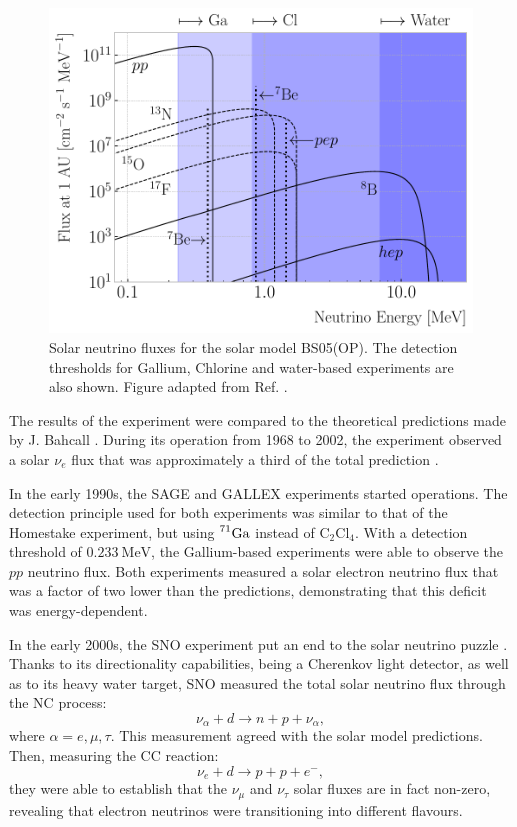 \begin{figure}[t]
	\centering
	\includegraphics[width=.75\linewidth]{Images/Nu/solar_neutrino_flux.pdf}
	\caption[Solar neutrino fluxes for the solar model BS05(OP).]{Solar neutrino fluxes for the solar model BS05(OP). The detection thresholds for Gallium, Chlorine and water-based experiments are also shown. Figure adapted from Ref. \cite{Bahcall2004}.}
	\label{fig:solar_nu_flux}
\end{figure}

The results of the experiment were compared to the theoretical predictions made by J. Bahcall \cite{Bahcall1968}. During its operation from 1968 to 2002, the experiment observed a solar $\nu_{e}$ flux that was approximately a third of the total prediction \cite{Cleveland1998}.

In the early 1990s, the SAGE \cite{SAGE2009} and GALLEX \cite{GALLEX2010} experiments started operations. The detection principle used for both experiments was similar to that of the Homestake experiment, but using $\prescript{71}{}{\mathrm{Ga}}$ instead of $\mathrm{C}_{2}\mathrm{Cl}_{4}$. With a detection threshold of $0.233~\mathrm{MeV}$, the Gallium-based experiments were able to observe the $pp$ neutrino flux. Both experiments measured a solar electron neutrino flux that was a factor of two lower than the predictions, demonstrating that this deficit was energy-dependent.

In the early 2000s, the SNO experiment put an end to the solar neutrino puzzle \cite{Ahmad2001,Ahmad2002}. Thanks to its directionality capabilities, being a Cherenkov light detector, as well as to its heavy water target, SNO measured the total solar neutrino flux through the NC process:
\begin{equation}
	\nu_{\alpha} + d \longrightarrow n + p + \nu_{\alpha},
\end{equation}
where $\alpha = e, \mu, \tau$. This measurement agreed with the solar model predictions. Then, measuring the CC reaction:
\begin{equation}
	\nu_{e} + d \longrightarrow p + p + e^{-},
\end{equation}
they were able to establish that the $\nu_{\mu}$ and $\nu_{\tau}$ solar fluxes are in fact non-zero, revealing that electron neutrinos were transitioning into different flavours.

